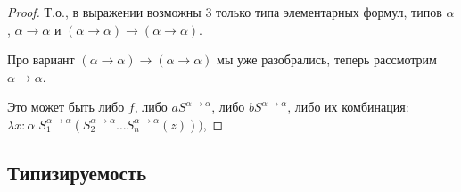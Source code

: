 \begin{proof}
Т.о., в выражении возможны 3 только типа элементарных формул, типов $\alpha$, $\alpha\rightarrow\alpha$ и
$(\alpha\rightarrow\alpha)\rightarrow(\alpha\rightarrow\alpha)$.

Про вариант $(\alpha\rightarrow\alpha)\rightarrow(\alpha\rightarrow\alpha)$ мы уже разобрались, теперь
рассмотрим $\alpha\rightarrow\alpha$.

Это может быть либо $f$, либо $a S^{\alpha\rightarrow\alpha}$, либо $b S^{\alpha\rightarrow\alpha}$,
либо их комбинация: 
$\lambda x:\alpha.S_1^{\alpha\rightarrow\alpha}(S_2^{\alpha\rightarrow\alpha}\dots S_n^{\alpha\rightarrow\alpha}(z)))$,


\end{proof}

\subsection{Типизируемость}

